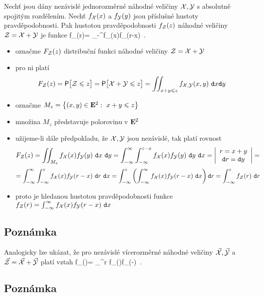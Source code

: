 Nech\v t jsou d\'any nez\'avisl\'e jednorozm\v ern\'e n\'ahodn\'e veli\v ciny ${\mathcal X},{\mathcal Y}$ s absolutn\v e spojit\'ym rozd\v elen\'im. Nech\v t $f_{\mathcal X}(x)$ a $f_{\mathcal Y}(y)$ jsou p\v r\'islu\v sn\'e hustoty pravd\v epodobnosti. Pak hustotou pravd\v epodobnosti $f_{\mathcal{Z}}(z)$ n\'ahodn\'e veli\v ciny ${\mathcal{Z}}={\mathcal X}+{\mathcal Y}$ je funkce \BE f_\ZZZ(r)= \int_{-\infty}^\infty f_\X(x)f_\Y(r-x)~\dx. \label{konvicka2} \EE

\Proof

\begin{itemize}
\item ozna\v cme $F_{\mathcal{Z}}(z)$ distribu\v cn\'i funkci n\'ahodn\'e veli\v ciny ${\mathcal{Z}}={\mathcal X}+{\mathcal Y}$
\item pro ni plat\'i
%
$$F_{\mathcal{Z}}(z)=\mbox{\sf P}\bigl[{\mathcal{Z}} \leqslant z\bigr]=\mbox{\sf P}\bigl[{\mathcal X}+{\mathcal Y} \leqslant z\bigr]=\iint_{x+y \leqslant z} f_{{\mathcal X},{\mathcal Y}}(x,y)~\mathtt{d}x\mathtt{d}y$$

\item ozna\v cme $M_z=\bigl\{(x,y)\in{\mathbf E}^2:~x+y\leqslant z\bigr\}$
\item mno\v zina $M_z$ p\v redstavuje polorovinu v ${\mathbf E}^2$
\item u\v zijeme-li d\'ale p\v redpokladu, \v ze ${\mathcal X},{\mathcal Y}$ jsou nez\'avisl\'e, tak platí rovnost
%
$$F_{\mathcal{Z}}(z)=\iint_{M_z} f_{\mathcal X}(x)f_{\mathcal Y}(y)~\mathtt{d}x~\mathtt{d}y= \int_{-\infty}^\infty \int_{-\infty}^{z-x} f_{\mathcal X}(x)f_{\mathcal Y}(y)~\mathtt{d}y~\mathtt{d}x= \left|\begin{array}{c} r=x+y\\ \mathtt{d}r=\mathtt{d}y \end{array}\right|=$$
%
$$= \int_{-\infty}^\infty \int_{-\infty}^{z} f_{\mathcal X}(x)f_{\mathcal Y}(r-x)~\mathtt{d}r~\mathtt{d}x= \int_{-\infty}^{z} \left(\int_{-\infty}^\infty f_{\mathcal X}(x)f_{\mathcal Y}(r-x)~\mathtt{d}x \right)\mathtt{d}r= \int_{-\infty}^{z} f_{\mathcal{Z}}(r)~\mathtt{d}r$$
\item proto je hledanou hustotou pravd\v epodobnosti funkce $f_{\mathcal{Z}}(r)= \int_{-\infty}^\infty f_{\mathcal X}(x)f_{\mathcal Y}(r-x)~\mathtt{d}x$

\end{itemize}

\subsection{Pozn\'amka}

Analogicky lze uk\'azat, \v ze pro nez\'avisl\'e v\'icerozm\v ern\'e n\'ahodn\'e veli\v ciny $\vec{\mathcal X},\vec{\mathcal Y}$ a $\vec{\mathcal{Z}}=\vec{\mathcal X}+\vec{\mathcal Y}$ plat\'i vztah
%
\BE f_{\ZZZZ}(\rrr)= \int_{\E^r} f_{\XX}(\x)f_{\YY}(\rrr-\x)~\dxx. \label{konvicka} \EE

\subsection{Pozn\'amka}

